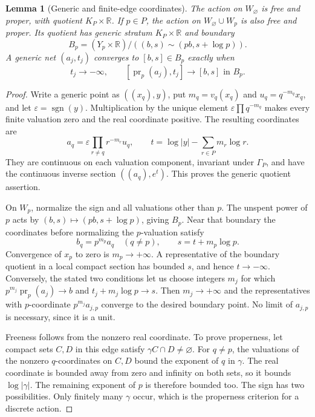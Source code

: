 \documentclass[11pt]{article}
\newcommand{\R}{\mathbb R}
\newcommand{\sgn}{\operatorname{sgn}}
\newtheorem{lemma}[theorem]{Lemma}
\theoremstyle{definition}
\theoremstyle{remark}
\begin{document}
\begin{lemma}[Generic and finite-edge coordinates]\label{lem:orbits}
The action on $W_\varnothing$ is free and proper, with quotient $K_P\times\R$. If $p\in P$, the action on $W_\varnothing\cup W_p$ is also free and proper. Its quotient has generic stratum $K_P\times\R$ and boundary
\[
 B_p=(Y_p\times\R)/((b,s)\sim(pb,s+\log p)).
\]
A generic net $(a_j,t_j)$ converges to $[b,s]\in B_p$ exactly when
\[
 t_j\longrightarrow-\infty,
 \qquad [\operatorname{pr}_p(a_j),t_j]\longrightarrow[b,s]\text{ in }B_p.
\]
\end{lemma}
\begin{proof}
Write a generic point as $((x_q),y)$, put $m_q=v_q(x_q)$ and $u_q=q^{-m_q}x_q$, and let $\varepsilon=\sgn(y)$. Multiplication by the unique element $\varepsilon\prod q^{-m_q}$ makes every finite valuation zero and the real coordinate positive. The resulting coordinates are
\begin{equation}\label{eq:genericcoords}
 a_q=\varepsilon\prod_{r\ne q}r^{-m_r}u_q,
 \qquad t=\log|y|-\sum_{r\in P}m_r\log r.
\end{equation}
They are continuous on each valuation component, invariant under $\Gamma_P$, and have the continuous inverse section $((a_q),e^t)$. This proves the generic quotient assertion.

On $W_p$, normalize the sign and all valuations other than $p$. The unspent power of $p$ acts by $(b,s)\mapsto(pb,s+\log p)$, giving $B_p$. Near that boundary the coordinates before normalizing the $p$-valuation satisfy
\[
 b_q=p^{m_p}a_q\quad(q\ne p),\qquad s=t+m_p\log p.
\]
Convergence of $x_p$ to zero is $m_p\to+\infty$. A representative of the boundary quotient in a local compact section has bounded $s$, and hence $t\to-\infty$. Conversely, the stated two conditions let us choose integers $m_j$ for which $p^{m_j}\operatorname{pr}_p(a_j)\to b$ and $t_j+m_j\log p\to s$. Then $m_j\to+\infty$ and the representatives with $p$-coordinate $p^{m_j}a_{j,p}$ converge to the desired boundary point. No limit of $a_{j,p}$ is necessary, since it is a unit.

Freeness follows from the nonzero real coordinate. To prove properness, let compact sets $C,D$ in this edge satisfy $\gamma C\cap D\ne\varnothing$. For $q\ne p$, the valuations of the nonzero $q$-coordinates on $C,D$ bound the exponent of $q$ in $\gamma$. The real coordinate is bounded away from zero and infinity on both sets, so it bounds $\log|\gamma|$. The remaining exponent of $p$ is therefore bounded too. The sign has two possibilities. Only finitely many $\gamma$ occur, which is the properness criterion for a discrete action.
\end{proof}
\end{document}
